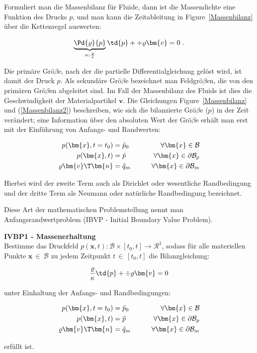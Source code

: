 Formuliert man die Massenbilanz für Fluide, dann ist die Massendichte eine Funktion des Drucks $p$, und man kann die Zeitableitung in Figure~\ref{Massenbilanz} über die Kettenregel auswerten:

\begin{equation}
\label{Massenbilanz2}
 \underbrace{\Pd{\varrho}{p}}_{=:\frac{\varrho}{\kappa}} \td{p} + \div{\varrho {\bm{v}}} = 0 \; .
\end{equation}

Die primäre Grö$\beta$e, nach der die partielle Differentialgleichung gelöst wird, ist damit der Druck $p$. Als sekundäre Grö$\beta$e bezeichnet man Feldgrö$\beta$en, die von den primären Grö$\beta$en abgeleitet sind. Im Fall der Massenbilanz des Fluids ist dies die Geschwindigkeit der Materialpartikel $\bm{v}$. Die Gleichungen Figure~\ref{Massenbilanz} und (\ref{Massenbilanz2}) beschreiben, wie sich die bilanzierte Grö$\beta$e ($p$) in der Zeit verändert; eine Information über den absoluten Wert der Grö$\beta$e erhält man erst mit der Einführung von Anfangs- und Randwerten:

\begin{align}
p(\bm{x},t=t_0) & = \tilde{p}_0 \qquad &\forall \bm{x} \in \mathcal{B}& \\
p(\bm{x},t) & = \tilde{p} \qquad &\forall \bm{x} \in \partial \mathcal{B}_p& \\
\varrho \bm{v}\T \bm{n} & = \tilde{q}_m \qquad &\forall \bm{x} \in \partial\mathcal{B}_m&
\end{align}

Hierbei wird der zweite Term auch als Dirichlet oder wesentliche Randbedingung und der dritte Term als Neumann oder natürliche Randbedingung bezeichnet.

Diese Art der mathematischen Problemstellung nennt man Anfangsrandwertproblem (IBVP - Initial Boundary Value Problem).

\begin{framed}
\textbf{IVBP1 - Massenerhaltung}\\
Bestimme das Druckfeld $p(\bm{x},t): \mathcal{B} \times [t_0,t] \rightarrow \mathcal{R}^1$, sodass für alle materiellen Punkte $\bm{x} \, \in \, \mathcal{B}$ zu jedem Zeitpunkt $t \, \in \, [t_0,t]$ die Bilanzgleichung:

\begin{equation}
\frac{\varrho}{\kappa} \td{p} + \div{\varrho {\bm{v}}} = 0
\end{equation}

unter Einhaltung der Anfangs- und Randbedingungen:

\begin{align}
p(\bm{x},t=t_0) & = \tilde{p}_0 \qquad &\forall \bm{x} \in \mathcal{B}& \\
p(\bm{x},t) & = \tilde{p} \qquad &\forall \bm{x} \in \partial \mathcal{B}_p& \\
\varrho \bm{v}\T \bm{n} & = \tilde{q}_m \qquad &\forall \bm{x} \in \partial\mathcal{B}_m&
\end{align}

erfüllt ist.
\end{framed}

